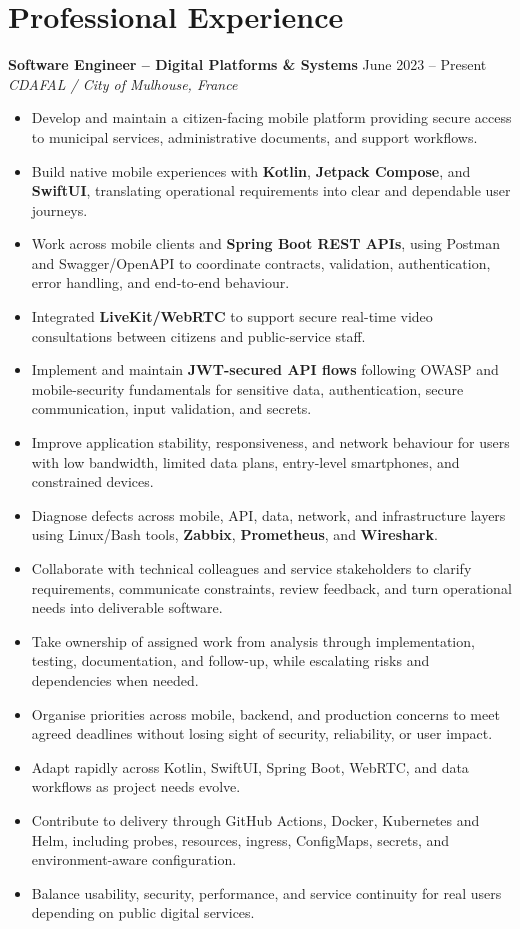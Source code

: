 \documentclass[10pt,a4paper]{article}
\begin{document}
\section{Professional Experience}
\textbf{Software Engineer -- Digital Platforms \& Systems} \hfill June 2023 -- Present\\
\textit{CDAFAL / City of Mulhouse, France}
\begin{itemize}
  \item Develop and maintain a citizen-facing mobile platform providing secure access to municipal services, administrative documents, and support workflows.
  \item Build native mobile experiences with \textbf{Kotlin}, \textbf{Jetpack Compose}, and \textbf{SwiftUI}, translating operational requirements into clear and dependable user journeys.
  \item Work across mobile clients and \textbf{Spring Boot REST APIs}, using Postman and Swagger/OpenAPI to coordinate contracts, validation, authentication, error handling, and end-to-end behaviour.
  \item Integrated \textbf{LiveKit/WebRTC} to support secure real-time video consultations between citizens and public-service staff.
  \item Implement and maintain \textbf{JWT-secured API flows} following OWASP and mobile-security fundamentals for sensitive data, authentication, secure communication, input validation, and secrets.
  \item Improve application stability, responsiveness, and network behaviour for users with low bandwidth, limited data plans, entry-level smartphones, and constrained devices.
  \item Diagnose defects across mobile, API, data, network, and infrastructure layers using Linux/Bash tools, \textbf{Zabbix}, \textbf{Prometheus}, and \textbf{Wireshark}.
  \item Collaborate with technical colleagues and service stakeholders to clarify requirements, communicate constraints, review feedback, and turn operational needs into deliverable software.
  \item Take ownership of assigned work from analysis through implementation, testing, documentation, and follow-up, while escalating risks and dependencies when needed.
  \item Organise priorities across mobile, backend, and production concerns to meet agreed deadlines without losing sight of security, reliability, or user impact.
  \item Adapt rapidly across Kotlin, SwiftUI, Spring Boot, WebRTC, and data workflows as project needs evolve.
  \item Contribute to delivery through GitHub Actions, Docker, Kubernetes and Helm, including probes, resources, ingress, ConfigMaps, secrets, and environment-aware configuration.
  \item Balance usability, security, performance, and service continuity for real users depending on public digital services.
\end{itemize}
\end{document}
